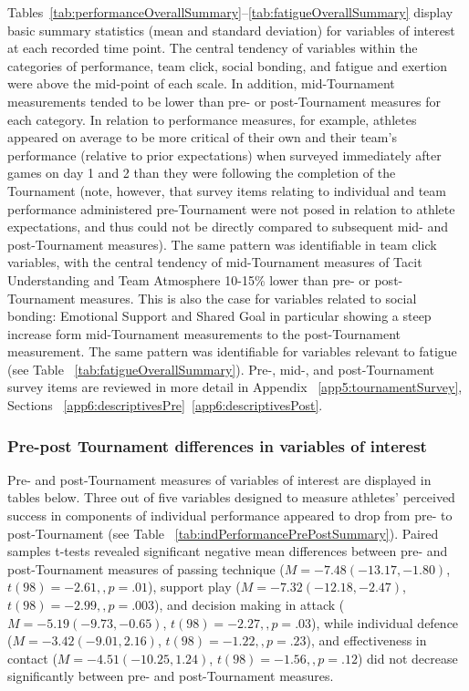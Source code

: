 Tables~\ref{tab:performanceOverallSummary}\nobreakdash--\ref{tab:fatigueOverallSummary} display basic summary statistics (mean and standard deviation) for variables of interest at each recorded time point. The central tendency of variables within the categories of performance, team click, social bonding, and fatigue and exertion were above the mid-point of each scale. In addition, mid-Tournament measurements tended to be lower than pre- or post-Tournament measures for each category. In relation to performance measures, for example, athletes appeared on average to be more critical of their own and their team’s performance (relative to prior expectations) when surveyed immediately after games on day 1 and 2 than they were following the completion of the Tournament (note, however, that survey items relating to individual and team performance administered pre-Tournament were not posed in relation to athlete expectations, and thus could not be directly compared to subsequent mid- and post-Tournament measures). The same pattern was identifiable in team click variables, with the central tendency of mid-Tournament measures of Tacit Understanding and Team Atmosphere 10-15\% lower than pre- or post-Tournament measures. This is also the case for variables related to social bonding: Emotional Support and Shared Goal in particular showing a steep increase form mid-Tournament measurements to the post-Tournament measurement. The same pattern was identifiable for variables relevant to fatigue (see Table ~\ref{tab:fatigueOverallSummary}).
Pre-, mid-, and post-Tournament survey items are reviewed in more detail in Appendix ~\ref{app5:tournamentSurvey}, Sections ~\ref{app6:descriptivesPre}\nobreakdash~\ref{app6:descriptivesPost}.







\subsubsection{Pre-post Tournament differences in variables of interest}
Pre- and post-Tournament measures of variables of interest are displayed in tables below.  Three out of five variables designed to measure athletes' perceived success in components of individual performance appeared to drop from pre- to post-Tournament (see Table ~\ref{tab:indPerformancePrePostSummary}).  Paired samples t-tests revealed significant negative mean differences between pre- and post-Tournament measures of passing technique ($M = -7.48 (-13.17, -1.80)$, $t(98)= -2.61,, p = .01$), support play ($M = -7.32 (-12.18, -2.47)$, $t(98)= -2.99,, p = .003$), and decision making in attack ($M = -5.19 ( -9.73, -0.65)$, $t(98)= -2.27,, p = .03$), while individual defence ($M = -3.42 (-9.01, 2.16)$, $t(98)= -1.22,, p = .23$), and effectiveness in contact ($M = -4.51 (-10.25, 1.24)$, $t(98)= -1.56,, p = .12$) did not decrease significantly between pre- and post-Tournament measures.

